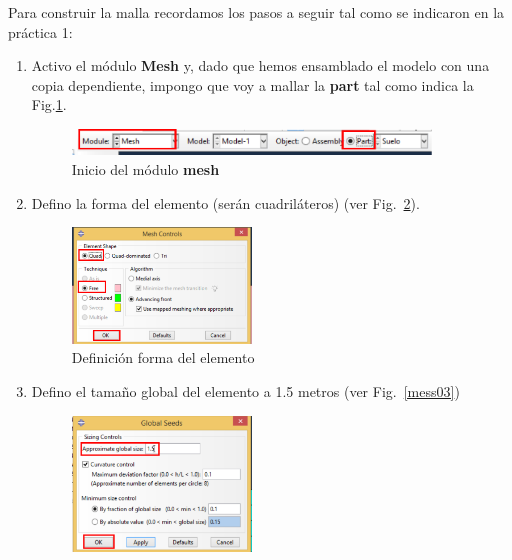   Para construir la malla recordamos los pasos a seguir tal como se
  indicaron en la práctica 1:
  \begin{enumerate}
  \item Activo el módulo \textbf{Mesh} y, dado que hemos ensamblado el
    modelo con una copia dependiente, impongo que voy a mallar la
    \textbf{part} tal como indica la Fig.\ref{mess01}.
    \begin{figure}[!h]
      \begin{center}
        \includegraphics[width=0.9\textwidth]{./body/images/mess01.pdf}
      \end{center}
      \caption{Inicio del módulo \textbf{mesh}}
      \label{mess01}
    \end{figure}
  \item Defino la forma del elemento (serán cuadriláteros) (ver
    Fig.~\ref{mess02}).
    \begin{figure}[!h]
      \begin{center}
        \includegraphics[width=0.45\textwidth]{./body/images/mess02.pdf}
      \end{center}
      \caption{Definición forma del elemento}
      \label{mess02}
    \end{figure}
  \item Defino el tamaño global del elemento a 1.5 metros (ver
    Fig.~\ref{mess03})
    \begin{figure}[!h]
      \begin{center}
        \includegraphics[width=0.45\textwidth]{./body/images/mess03.pdf}

\end{center}
\end{figure}
\end{enumerate}
